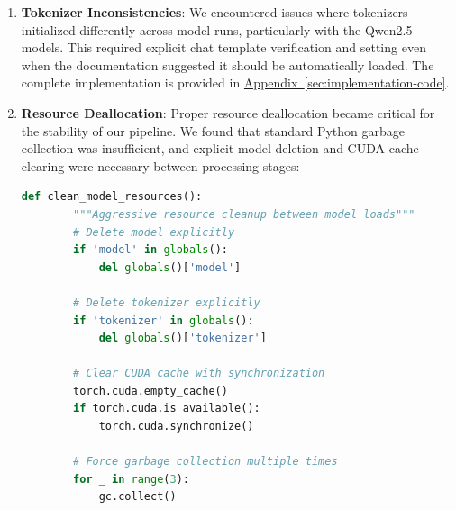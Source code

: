\begin{enumerate}
    To address this, we had to explicitly pin langchain-huggingface to version 0.1.2 in our installation requirements. Without such version pinning, the same code would fail when dependencies received updates, highlighting the fragility of deep learning pipelines that rely on multiple rapidly evolving libraries.
    
    Additionally, we found that the \texttt{protobuf} package version was critical for compatibility between Weaviate and our model processing pipeline. The version needed to be specifically upgraded with the command \texttt{pip install --upgrade -q protobuf} to prevent serialization errors when moving between the fine-tuning and vector database components of our system.
    
    \item \textbf{Tokenizer Inconsistencies}: We encountered issues where tokenizers initialized differently across model runs, particularly with the Qwen2.5 models. This required explicit chat template verification and setting even when the documentation suggested it should be automatically loaded. The complete implementation is provided in \hyperref[code:tokenizer-verification]{Appendix~\ref{sec:implementation-code}}.
    
    \item \textbf{Resource Deallocation}: Proper resource deallocation became critical for the stability of our pipeline. We found that standard Python garbage collection was insufficient, and explicit model deletion and CUDA cache clearing were necessary between processing stages:

    \begin{lstlisting}[breaklines=true,language=python, caption=Resource Deallocation Implementation, label=code:resource-deallocation]
    def clean_model_resources():
        """Aggressive resource cleanup between model loads"""
        # Delete model explicitly
        if 'model' in globals():
            del globals()['model']
        
        # Delete tokenizer explicitly 
        if 'tokenizer' in globals():
            del globals()['tokenizer']
        
        # Clear CUDA cache with synchronization
        torch.cuda.empty_cache()
        if torch.cuda.is_available():
            torch.cuda.synchronize()
        
        # Force garbage collection multiple times
        for _ in range(3):
            gc.collect()
    \end{lstlisting}
\end{enumerate}

